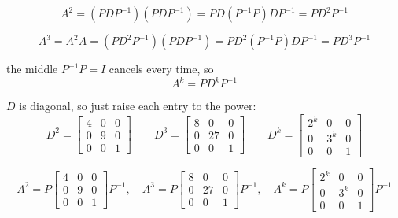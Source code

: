 \documentclass{article}
\begin{document}
\[
A^2 = (PDP^{-1})(PDP^{-1}) = PD(P^{-1}P)DP^{-1} = PD^2P^{-1}
\]

\[
A^3 = A^2 A = (PD^2P^{-1})(PDP^{-1}) = PD^2(P^{-1}P)DP^{-1} = PD^3P^{-1}
\]

the middle $P^{-1}P = I$ cancels every time, so
\[
A^k = PD^kP^{-1}
\]

$D$ is diagonal, so just raise each entry to the power:
\[
D^2 =
\begin{bmatrix}
4 & 0 & 0 \\
0 & 9 & 0 \\
0 & 0 & 1
\end{bmatrix}
\qquad
D^3 =
\begin{bmatrix}
8 & 0 & 0 \\
0 & 27 & 0 \\
0 & 0 & 1
\end{bmatrix}
\qquad
D^k =
\begin{bmatrix}
2^k & 0 & 0 \\
0 & 3^k & 0 \\
0 & 0 & 1
\end{bmatrix}
\]

\[
\boxed{
A^2 = P
\begin{bmatrix}
4 & 0 & 0 \\
0 & 9 & 0 \\
0 & 0 & 1
\end{bmatrix}
P^{-1},
\quad
A^3 = P
\begin{bmatrix}
8 & 0 & 0 \\
0 & 27 & 0 \\
0 & 0 & 1
\end{bmatrix}
P^{-1},
\quad
A^k = P
\begin{bmatrix}
2^k & 0 & 0 \\
0 & 3^k & 0 \\
0 & 0 & 1
\end{bmatrix}
P^{-1}
}
\]
\end{document}
